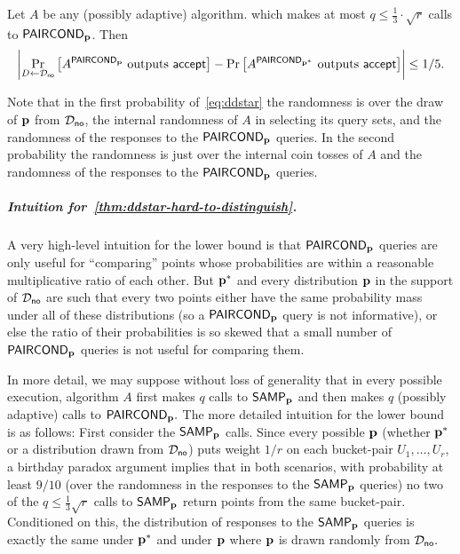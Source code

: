 \begin{theorem} \label{thm:ddstar-hard-to-distinguish}
Let $A$ be any (possibly adaptive) algorithm. which makes at most
$q \leq {\frac{1}3} \cdot  \sqrt{r}
$
calls to ${\sf PAIRCOND}_{\mathbf{p}}$.
Then
\begin{equation} \label{eq:ddstar}
\left|
\Pr_{D \leftarrow \mathcal{D}_{\textsf{no}}}
   \left[A^{{\sf PAIRCOND}_{\mathbf{p}}} \text{~outputs~} \mbox{\textsf{accept}}\right] -
\Pr\left[A^{{\sf PAIRCOND}_{\mathbf{p}^\ast}} \text{~outputs~} \mbox{\textsf{accept}}\right]
\right|
\leq 1/5.
\end{equation}
\end{theorem}
Note that in the first probability of~\cref{eq:ddstar} the randomness is over
the draw of $\mathbf{p}$ from $\mathcal{D}_{\textsf{no}}$,
the internal randomness of $A$ in selecting its query sets, and the randomness
of the responses to the ${\sf PAIRCOND}_{\mathbf{p}}$ queries.
In the second probability the randomness is
just over the internal coin tosses of $A$ and the randomness of the responses
to the ${\sf PAIRCOND}_{\mathbf{p}}$ queries.

\subparagraph{Intuition for~\cref{thm:ddstar-hard-to-distinguish}.}
A very high-level intuition for the lower bound is that ${\sf PAIRCOND}_{\mathbf{p}}$
queries are only useful for ``comparing'' points whose probabilities
are within a reasonable multiplicative ratio of each other.
But $\mathbf{p}^\ast$ and every distribution $\mathbf{p}$ in the support of
$\mathcal{D}_{\textsf{no}}$ are such that every two points either have the
same probability mass under all of these distributions (so
a ${\sf PAIRCOND}_{\mathbf{p}}$ query is not informative), or else the ratio of their
probabilities is so skewed that a small number of ${\sf PAIRCOND}_{\mathbf{p}}$ queries
is not useful for comparing them.

In more detail, we may suppose without loss of generality that in every possible
execution, algorithm $A$ first makes $q$ calls to ${\sf SAMP}_{\mathbf{p}}$ and
then makes $q$ (possibly adaptive) calls to ${\sf PAIRCOND}_{\mathbf{p}}.$
The more detailed intuition for the lower bound is as follows:  First consider
the ${\sf SAMP}_{\mathbf{p}}$ calls.  Since every
possible $\mathbf{p}$ (whether $\mathbf{p}^\ast$ or a distribution drawn from
$\mathcal{D}_{\textsf{no}}$) puts weight $1/r$ on each bucket-pair
$U_1,\dots,U_r$, a birthday paradox argument implies that in
both scenarios, with probability
at least $9/10$ (over the randomness in the responses to the ${\sf SAMP}_{\mathbf{p}}$
queries) no two of the $q \leq {\frac{1}3} \sqrt{r}$
calls to ${\sf SAMP}_{\mathbf{p}}$ return points from the
same bucket-pair.
Conditioned on this, the distribution of responses to the ${\sf SAMP}_{\mathbf{p}}$ queries
is exactly the same under $\mathbf{p}^\ast$ and under $\mathbf{p}$ where $\mathbf{p}$ is
drawn randomly from $\mathcal{D}_{\textsf{no}}.$

